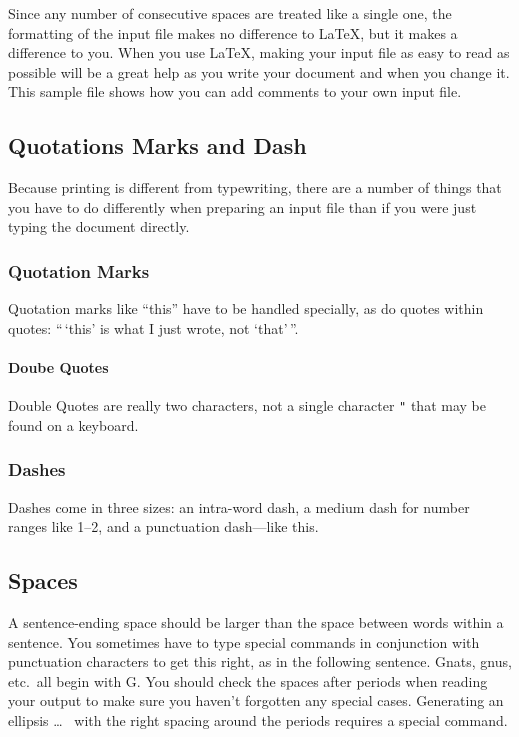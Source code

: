Since any number of consecutive spaces are treated
like a single one, the formatting of the input
file makes no difference to
      \LaTeX,		     %
but it makes a difference to you.  When you use
\LaTeX, making your input file as easy to read
as possible will be a great help as you write
your document and when you change it.  This sample
file shows how you can add comments to your own input
file.

\subsection{Quotations Marks and Dash}
Because printing is different from typewriting,
there are a number of things that you have to do
differently when preparing an input file than if
you were just typing the document directly.
\subsubsection{Quotation Marks}
Quotation marks like
       ``this''
have to be handled specially, as do quotes within
quotes:
       ``\,`this'            %
	is what I just
	wrote, not  `that'\,''.
\paragraph{Doube Quotes}
Double Quotes are really two characters, not a single character
\verb|"| that may be found on a keyboard.
\subsubsection{Dashes}
Dashes come in three sizes: an
       intra-word
dash, a medium dash for number ranges like
       1--2,
and a punctuation
       dash---like
this.
\subsection{Spaces}
A sentence-ending space should be larger than the
space between words within a sentence.	You
sometimes have to type special commands in
conjunction with punctuation characters to get
this right, as in the following sentence.
       Gnats, gnus, etc.\ all  %
       begin with G\@.	       %
You should check the spaces after periods when
reading your output to make sure you haven't
forgotten any special cases.  Generating an
ellipsis
       \ldots\		     %
with the right spacing around the periods requires
a special command.

